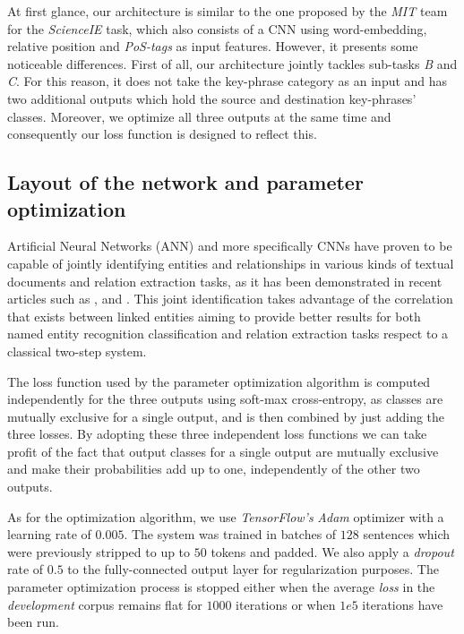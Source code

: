 \documentclass[a4paper,11pt,twocolumn,twoside]{article}
\begin{document}
At first glance, our architecture is similar to the one proposed by the \emph{MIT} team for the \emph{ScienceIE} task, which also consists of a CNN using word-embedding, relative position and \emph{PoS-tags} as input features. However, it presents some noticeable differences. First of all, our architecture jointly tackles sub-tasks \emph{B} and \emph{C}.  For this reason, it does not take the key-phrase category as an input and has two additional outputs which hold the source and destination key-phrases' classes. Moreover, we optimize all three outputs at the same time and consequently our loss function is designed to reflect this.


\subsection{ Layout of the network and parameter optimization}

Artificial Neural Networks (ANN) and more specifically CNNs have proven to be capable of jointly identifying entities and relationships in various kinds of textual documents and relation extraction tasks, as it has been demonstrated in recent articles such as \cite{singh2013joint}, \cite{shickel2017deep} and \cite{li2017neural}. This joint identification takes advantage of the correlation that exists between linked entities aiming to provide better results for both named entity recognition classification and relation extraction tasks respect to a classical two-step system.

The loss function used by the parameter optimization algorithm is computed independently for the three outputs using soft-max cross-entropy, as classes are mutually exclusive for a single output, and is then combined by just adding the three losses. By adopting these three independent loss functions we can take profit of the fact that output classes for a single output are mutually exclusive and make their probabilities add up to one, independently of the other two outputs.

As for the optimization algorithm, we use \emph{TensorFlow's} \emph{Adam} optimizer with
a learning rate of $0.005$. The system was trained in batches of $128$ sentences
which were previously stripped to up to $50$ tokens and padded. We also apply a
\emph{dropout} rate of $0.5$ to the fully-connected output layer for regularization
purposes. The parameter optimization process is stopped either when the average \emph{loss} in the \emph{development} corpus remains flat for $1000$ iterations or when $1e5$ iterations have been run.
\end{document}
